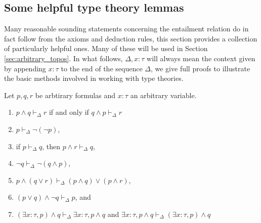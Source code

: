 \documentclass{tac}
\begin{document}
	\subsection{Some helpful type theory lemmas}\label{sec:helpful_lemmas}
	\label{helpfulLemmas}
	Many reasonable sounding statements concerning the entailment relation do in fact follow from the axioms and deduction rules, this section provides a collection of particularly helpful ones. Many of these will be used in Section \ref{sec:arbitrary_topos}. In what follows, $\Delta,x:\tau$ will always mean the context given by appending $x:\tau$ to the end of the sequence $\Delta$, we give full proofs to illustrate the basic methods involved in working with type theories.
	\begin{lemma}
		\label{weakening}
		Let $p,q,r$ be arbtirary formulas and $x:\tau$ an arbitrary variable.
		\begin{enumerate}
			\item $p \wedge q \vdash_\Delta r$ if and only if $q \wedge p \vdash_\Delta r$
			\item $p \vdash_\Delta \neg(\neg p)$,
			\item if $p \vdash_\Delta q$, then $p \wedge r \vdash_\Delta q$,
			\item $\neg q \vdash_\Delta \neg(q \wedge p)$,
			\item $p \wedge (q \vee r) \vdash_\Delta (p \wedge q) \vee (p \wedge r)$,
			\item $(p \vee q) \wedge \neg q \vdash_\Delta p$, and
			\item $(\exists x:\tau, p) \wedge q \vdash_{\Delta}\exists x:\tau, p \wedge q$ and $\exists x:\tau, p \wedge q \vdash_{\Delta} (\exists x:\tau, p) \wedge q$
		\end{enumerate}
	\end{lemma}
\end{document}
